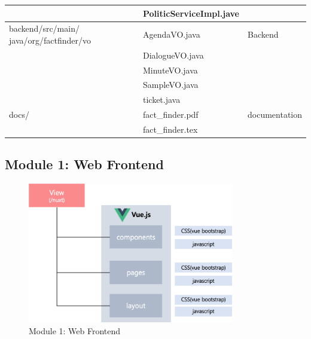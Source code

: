 \documentclass[conference]{IEEEtran}
\begin{document}
\begin{table}[htbp]
\begin{center}
\begin{tabular}{|p{2.5cm}|p{3.7cm}|p{1.5cm}|}
& PoliticServiceImpl.jave & \\
\hline
backend/src/main/ java/org/factfinder/vo & AgendaVO.java & Backend \\
&DialogueVO.java & \\
&MinuteVO.java & \\
&SampleVO.java & \\
&ticket.java & \\
\hline
docs/ & fact\_finder.pdf & documentation \\
& fact\_finder.tex & \\
\hline
\end{tabular}
\label{tab1}
\end{center}
\end{table}

\subsection{Module 1: Web Frontend}


\begin{figure}[htbp]
\centerline{\includegraphics[width=90mm,scale=0.5]{fig/6_4.png}}
\caption{Module 1: Web Frontend}
\label{fig}
\end{figure}
\end{document}
